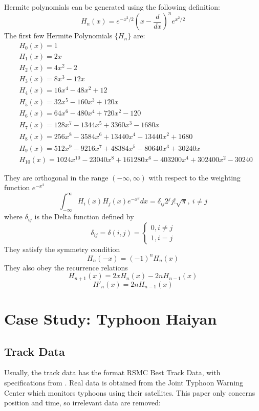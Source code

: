 \documentclass[a4paper, 11pt]{article}
\begin{document}
Hermite polynomials \cite{bib:hermite} can be generated using the following definition:
$$H_n(x) = e^{-x^2/2}\left(x-\frac{d}{dx}\right)^{n}e^{x^2/2}$$
The first few Hermite Polynomials $\lbrace{H_n}\rbrace$ are:
\begin{align*}
& H_0(x)=1\\
& H_1(x)=2x\\
& H_2(x)=4x^2-2\\
& H_3(x)=8x^3-12x\\
& H_4(x)=16x^4-48x^2+12\\
& H_5(x)=32x^5-160x^3+120x\\
& H_6(x)=64x^6-480x^4+720x^2-120\\
& H_7(x)=128x^7-1344x^5+3360x^3-1680x\\
& H_8(x)=256x^8-3584x^6+13440x^4-13440x^2+1680\\
& H_9(x)=512x^9-9216x^7+48384x^5-80640x^3+30240x\\
& H_{10}(x)=1024x^{10}-23040x^8+161280x^6-403200x^4+302400x^2-30240
\end{align*}

They are orthogonal in the range $(-\infty,\infty)$ with respect to the weighting function $e^{-x^2}$
$$\int_{-\infty}^{\infty}H_i(x)H_j(x)e^{-x^2}dx=\delta_{ij}2^{j}j!\sqrt{\pi}, \ i\neq j$$
where $\delta_{ij}$ is the Delta function \cite{bib:delta} defined by
$$\delta_{ij}=\delta(i,j)=
\begin{cases}
0, i \neq j \\
1, i = j
\end{cases}
$$
They satisfy the symmetry condition
$$H_n(-x)=(-1)^{n}H_n(x)$$
They also obey the recurrence relations
$$H_{n+1}(x) = 2xH_n(x)-2nH_{n-1}(x)$$
$$H'_n(x)=2nH_{n-1}(x)$$

\section{Case Study: Typhoon Haiyan}
\subsection{Track Data}
Usually, the track data has the format RSMC Best Track Data, with specifications from \cite{bib:track}. Real data is obtained from the Joint Typhoon Warning Center \cite{bib:trackdata} which monitors typhoons using their satellites. This paper only concerns position and time, so irrelevant data are removed:
\end{document}
